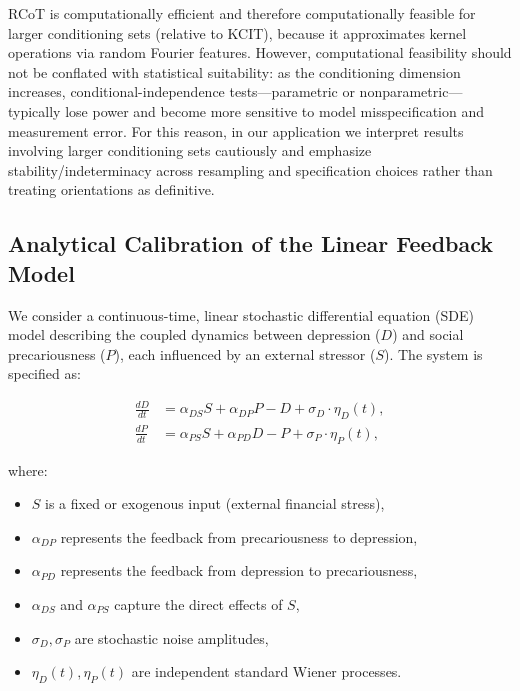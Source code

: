 \documentclass[
]{article}
\providecommand{\tightlist}{%
  \setlength{\itemsep}{0pt}\setlength{\parskip}{0pt}}\usepackage{longtable,booktabs,array}
\begin{document}
\textcolor{BrickRed}{RCoT is computationally efficient and therefore computationally feasible for larger conditioning sets (relative to KCIT), because it approximates kernel operations via random Fourier features.
However, computational feasibility should not be conflated with statistical suitability: as the conditioning dimension increases, conditional-independence tests—parametric or nonparametric—typically lose power and become more sensitive to model misspecification and measurement error. For this reason, in our application we interpret results involving larger conditioning sets cautiously and emphasize stability/indeterminacy across resampling and specification choices rather than treating orientations as definitive.}

\subsection{Analytical Calibration of the Linear Feedback
Model}\label{sec-analcalibration}

We consider a continuous-time, linear stochastic differential equation
(SDE) model describing the coupled dynamics between depression (\(D\))
and social precariousness (\(P\)), each influenced by an external
stressor (\(S\)). The system is specified as:

\[
\begin{aligned}
\frac{dD}{dt} &= \alpha_{DS} S + \alpha_{DP} P - D + \sigma_D \cdot \eta_D(t), \\
\frac{dP}{dt} &= \alpha_{PS} S + \alpha_{PD} D - P + \sigma_P \cdot \eta_P(t),
\end{aligned}
\]

where:

\begin{itemize}
\tightlist
\item
  \(S\) is a fixed or exogenous input (external financial stress),
\item
  \(\alpha_{DP}\) represents the feedback from precariousness to
  depression,
\item
  \(\alpha_{PD}\) represents the feedback from depression to
  precariousness,
\item
  \(\alpha_{DS}\) and \(\alpha_{PS}\) capture the direct effects of
  \(S\),
\item
  \(\sigma_D, \sigma_P\) are stochastic noise amplitudes,
\item
  \(\eta_D(t), \eta_P(t)\) are independent standard Wiener processes.
\end{itemize}
\end{document}
